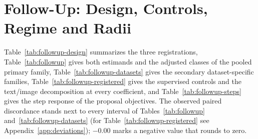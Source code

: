 
\section{Follow-Up: Design, Controls, Regime and Radii}
\label{app:followup}

Table~\ref{tab:followup-design} summarizes the three registrations,
Table~\ref{tab:followup} gives both estimands and the adjusted classes of the
pooled primary family, Table~\ref{tab:followup-datasets} gives the secondary
dataset-specific families, Table~\ref{tab:followup-registered} gives the
supervised controls and the text/image decomposition at every coefficient, and
Table~\ref{tab:followup-steps} gives the step response of the proposal
objectives. The observed paired discordance stands next to every interval of
Tables~\ref{tab:followup} and~\ref{tab:followup-datasets} (for
Table~\ref{tab:followup-registered} see Appendix~\ref{app:deviations}); $-0.00$
marks a negative value that rounds to zero.








